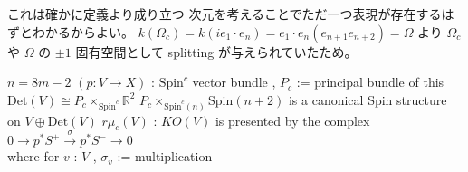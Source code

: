 \begin{Proof}
\itemprof
  これは確かに定義より成り立つ
\itemprof
  次元を考えることでただ一つ表現が存在するはずとわかるからよい。
\itemprof
  \(k(\Omega_c) = k(i e_1 \cdot e_n) = e_1 \cdot e_n (e_{n+1} e_{n+2}) = \Omega\) より
\itemprof
  \(\Omega_c\) や \(\Omega\) の \(\pm 1\) 固有空間として splitting が与えられていたため。
\end{Proof}

\begin{Theorem}
\itemwhen
  \(n = 8 m - 2\)
\itemdefi
  \For \((p : V \to X)\) : \(\text{Spin}^c\) vector bundle , \(P_c\) := principal bundle of this\\
  \Then \(\text{Det}(V) \cong P_c \times_{\text{Spin}^c} \mathbb{R}^2\)
\itemprop
  \Then \(P_c \times_{\text{Spin}^c(n)} \text{Spin}(n+2)\) is a canonical Spin structure on \(V \oplus \text{Det}(V) \)
\itemprop
  \Then \(r \mu_c(V)\) : \(KO(V)\) is presented by the complex \(0 \to p^* {S^+} \overset{\sigma}{\to} p^*{S^-} \to 0\) \\ where for \(v\) : \(V\) , \(\sigma_v\) := multiplication
\end{Theorem}